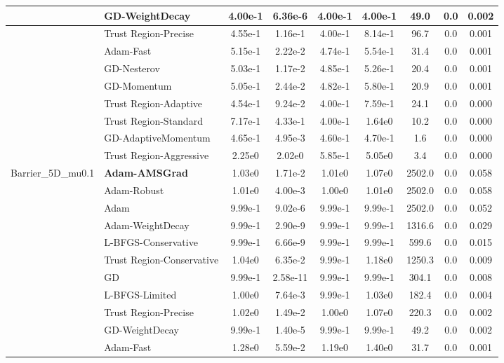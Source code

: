 \documentclass{article}
\begin{document}
\begin{longtable}{|l|l|c|c|c|c|c|c|c|}
\hline
 & GD-WeightDecay & 4.00e-1 & 6.36e-6 & 4.00e-1 & 4.00e-1 & 49.0 & 0.0 & 0.002 \\
\hline
 & Trust Region-Precise & 4.55e-1 & 1.16e-1 & 4.00e-1 & 8.14e-1 & 96.7 & 0.0 & 0.001 \\
\hline
 & Adam-Fast & 5.15e-1 & 2.22e-2 & 4.74e-1 & 5.54e-1 & 31.4 & 0.0 & 0.001 \\
\hline
 & GD-Nesterov & 5.03e-1 & 1.17e-2 & 4.85e-1 & 5.26e-1 & 20.4 & 0.0 & 0.001 \\
\hline
 & GD-Momentum & 5.05e-1 & 2.44e-2 & 4.82e-1 & 5.80e-1 & 20.9 & 0.0 & 0.001 \\
\hline
 & Trust Region-Adaptive & 4.54e-1 & 9.24e-2 & 4.00e-1 & 7.59e-1 & 24.1 & 0.0 & 0.000 \\
\hline
 & Trust Region-Standard & 7.17e-1 & 4.33e-1 & 4.00e-1 & 1.64e0 & 10.2 & 0.0 & 0.000 \\
\hline
 & GD-AdaptiveMomentum & 4.65e-1 & 4.95e-3 & 4.60e-1 & 4.70e-1 & 1.6 & 0.0 & 0.000 \\
\hline
 & Trust Region-Aggressive & 2.25e0 & 2.02e0 & 5.85e-1 & 5.05e0 & 3.4 & 0.0 & 0.000 \\
Barrier\_5D\_mu0.1 & \textbf{Adam-AMSGrad} & 1.03e0 & 1.71e-2 & 1.01e0 & 1.07e0 & 2502.0 & 0.0 & 0.058 \\
\hline
 & Adam-Robust & 1.01e0 & 4.00e-3 & 1.00e0 & 1.01e0 & 2502.0 & 0.0 & 0.058 \\
\hline
 & Adam & 9.99e-1 & 9.02e-6 & 9.99e-1 & 9.99e-1 & 2502.0 & 0.0 & 0.052 \\
\hline
 & Adam-WeightDecay & 9.99e-1 & 2.90e-9 & 9.99e-1 & 9.99e-1 & 1316.6 & 0.0 & 0.029 \\
\hline
 & L-BFGS-Conservative & 9.99e-1 & 6.66e-9 & 9.99e-1 & 9.99e-1 & 599.6 & 0.0 & 0.015 \\
\hline
 & Trust Region-Conservative & 1.04e0 & 6.35e-2 & 9.99e-1 & 1.18e0 & 1250.3 & 0.0 & 0.009 \\
\hline
 & GD & 9.99e-1 & 2.58e-11 & 9.99e-1 & 9.99e-1 & 304.1 & 0.0 & 0.008 \\
\hline
 & L-BFGS-Limited & 1.00e0 & 7.64e-3 & 9.99e-1 & 1.03e0 & 182.4 & 0.0 & 0.004 \\
\hline
 & Trust Region-Precise & 1.02e0 & 1.49e-2 & 1.00e0 & 1.07e0 & 220.3 & 0.0 & 0.002 \\
\hline
 & GD-WeightDecay & 9.99e-1 & 1.40e-5 & 9.99e-1 & 9.99e-1 & 49.2 & 0.0 & 0.002 \\
\hline
 & Adam-Fast & 1.28e0 & 5.59e-2 & 1.19e0 & 1.40e0 & 31.7 & 0.0 & 0.001 \\

\end{longtable}
\end{document}
